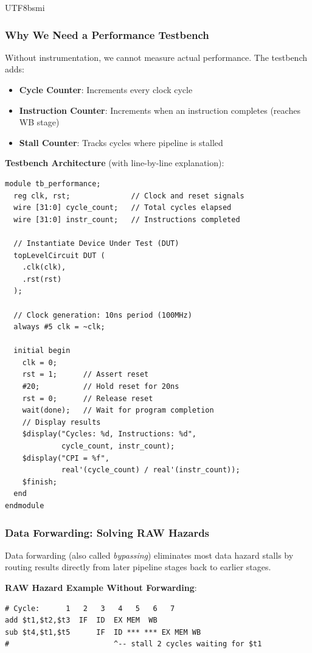 \documentclass[journal,twoside]{IEEEtran}
\begin{document}
\begin{CJK}{UTF8}{bsmi}
\subsubsection{Why We Need a Performance Testbench}
Without instrumentation, we cannot measure actual performance. The testbench adds:
\begin{itemize}
    \item \textbf{Cycle Counter}: Increments every clock cycle
    \item \textbf{Instruction Counter}: Increments when an instruction completes (reaches WB stage)
    \item \textbf{Stall Counter}: Tracks cycles where pipeline is stalled
\end{itemize}

\textbf{Testbench Architecture} (with line-by-line explanation):
\begin{lstlisting}
module tb_performance;
  reg clk, rst;              // Clock and reset signals
  wire [31:0] cycle_count;   // Total cycles elapsed
  wire [31:0] instr_count;   // Instructions completed
  
  // Instantiate Device Under Test (DUT)
  topLevelCircuit DUT (
    .clk(clk), 
    .rst(rst)
  );
  
  // Clock generation: 10ns period (100MHz)
  always #5 clk = ~clk;
  
  initial begin
    clk = 0;
    rst = 1;      // Assert reset
    #20;          // Hold reset for 20ns
    rst = 0;      // Release reset
    wait(done);   // Wait for program completion
    // Display results
    $display("Cycles: %d, Instructions: %d", 
             cycle_count, instr_count);
    $display("CPI = %f", 
             real'(cycle_count) / real'(instr_count));
    $finish;
  end
endmodule
\end{lstlisting}

\subsubsection{Data Forwarding: Solving RAW Hazards}
Data forwarding (also called \textit{bypassing}) eliminates most data hazard stalls by routing results directly from later pipeline stages back to earlier stages.

\textbf{RAW Hazard Example Without Forwarding}:
\begin{lstlisting}
# Cycle:      1   2   3   4   5   6   7
add $t1,$t2,$t3  IF  ID  EX MEM  WB
sub $t4,$t1,$t5      IF  ID *** *** EX MEM WB
#                        ^-- stall 2 cycles waiting for $t1
\end{lstlisting}


\end{CJK}
\end{document}
